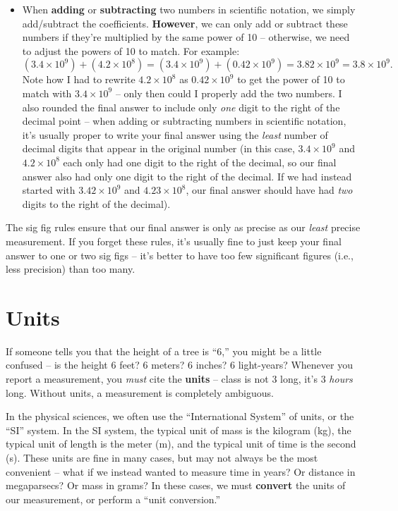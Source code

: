 \documentclass[11pt]{article}
\begin{document}
\begin{itemize}
    \item When \textbf{adding} or \textbf{subtracting} two numbers in scientific notation, we simply add/subtract the coefficients. \textbf{However}, we can only add or subtract these numbers if they're multiplied by the same power of 10 -- otherwise, we need to adjust the powers of 10 to match. For example:
    \begin{equation}
        (3.4 \times 10^9) + (4.2 \times 10^8) = (3.4 \times 10^9) + (0.42 \times 10^9) = 3.82 \times 10^9 = \boxed{3.8 \times 10^9}.
    \end{equation}
    Note how I had to rewrite $4.2 \times 10^8$ as $0.42 \times 10^9$ to get the power of 10 to match with $3.4 \times 10^9$ -- only then could I properly add the two numbers. I also rounded the final answer to include only \emph{one} digit to the right of the decimal point -- when adding or subtracting numbers in scientific notation, it's usually proper to write your final answer using the \emph{least} number of decimal digits that appear in the original number (in this case, $3.4 \times 10^9$ and $4.2 \times 10^8$ each only had one digit to the right of the decimal, so our final answer also had only one digit to the right of the decimal. If we had instead started with $3.42 \times 10^9$ and $4.23 \times 10^8$, our final answer should have had \emph{two} digits to the right of the decimal).    
\end{itemize}

The sig fig rules ensure that our final answer is only as precise as our \emph{least} precise measurement. If you forget these rules, it's usually fine to just keep your final answer to one or two sig figs -- it's better to have too few significant figures (i.e., less precision) than too many. 


\section{Units}
If someone tells you that the height of a tree is ``6,'' you might be a little confused -- is the height 6 feet? 6 meters? 6 inches? 6 light-years? Whenever you report a measurement, you \emph{must} cite the \textbf{units} -- class is not 3 long, it's 3 \emph{hours} long. Without units, a measurement is completely ambiguous. 

In the physical sciences, we often use the ``International System'' of units, or the ``SI'' system. In the SI system, the typical unit of mass is the kilogram (kg), the typical unit of length is the meter (m), and the typical unit of time is the second (s). These units are fine in many cases, but may not always be the most convenient -- what if we instead wanted to measure time in years? Or distance in megaparsecs? Or mass in grams? In these cases, we must \textbf{convert} the units of our measurement, or perform a ``unit conversion.''
\end{document}

